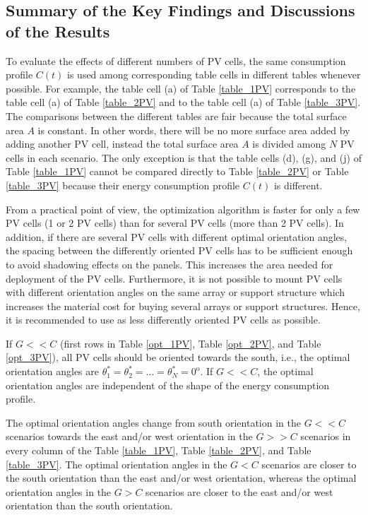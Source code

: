 \newpage



\subsection{Summary of the Key Findings and Discussions of the Results\label{findings}}

To evaluate the effects of different numbers of PV cells, the same consumption profile $C(t)$ is used among corresponding table cells in different tables whenever possible.  For example, the table cell (a) of Table \ref{table_1PV} corresponds to the table cell (a) of Table \ref{table_2PV} and to the table cell (a) of Table \ref{table_3PV}. The comparisons between the different tables are fair because the total surface area $A$ is constant. In other words, there will be no more surface area added by adding another PV cell, instead the total surface area $A$ is divided among $N$ PV cells in each scenario. The only exception is that the table cells (d), (g), and (j) of Table \ref{table_1PV} cannot be compared directly to Table \ref{table_2PV} or Table \ref{table_3PV} because their energy consumption profile $C(t)$ is different. 

From a practical point of view, the optimization algorithm is faster for only a few PV cells (1 or 2 PV cells) than for several PV cells (more than 2 PV cells). In addition, if there are several PV cells with different optimal orientation angles, the spacing between the differently oriented PV cells has to be sufficient enough to avoid shadowing effects on the panels. This increases the area needed for deployment of the PV cells. Furthermore, it is not possible to mount PV cells with different orientation angles on the same array or support structure which increases the material cost for buying several arrays or support structures. Hence, it is recommended to use as less differently oriented PV cells as possible.


If $G << C$ (first rows in Table \ref{opt_1PV}, Table \ref{opt_2PV}, and Table \ref{opt_3PV}), all PV cells should be oriented towards the south, i.e., the optimal orientation angles are $\theta_1^*=\theta_2^*=...=\theta_N^*=0^\mathrm{o}$. If $G << C$, the optimal orientation angles are independent of the shape of the energy consumption profile.

The optimal orientation angles change from south orientation in the $G << C$ scenarios towards the east and/or west orientation in the $G >> C$ scenarios in every column of the Table \ref{table_1PV}, Table \ref{table_2PV}, and Table \ref{table_3PV}. The optimal orientation angles in the $G < C$ scenarios are closer to the south orientation than the east and/or west orientation, whereas the optimal orientation angles in the $G > C$ scenarios are closer to the east and/or west orientation than the south orientation.

